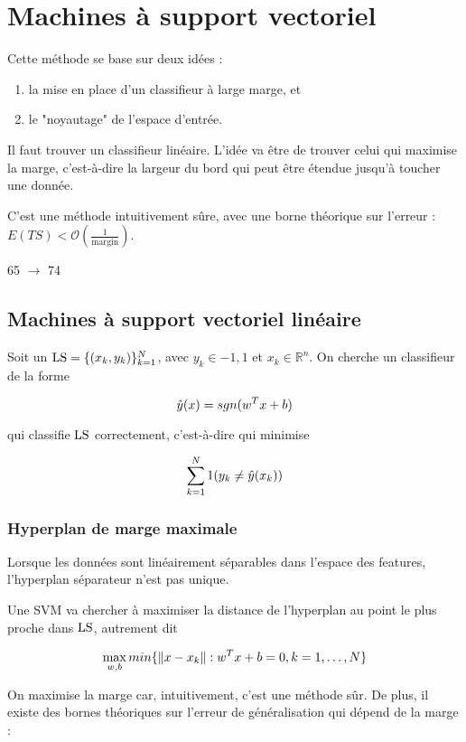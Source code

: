 \chapter{Machines à support vectoriel}

Cette méthode se base sur deux idées :

\begin{enumerate}
	\item la mise en place d'un classifieur à large marge, et
	\item le "noyautage" de l'espace d'entrée.
\end{enumerate}

Il faut trouver un classifieur linéaire. L'idée va être de trouver celui qui maximise la marge, c'est-à-dire la largeur du bord qui peut être étendue jusqu'à toucher une donnée.


C'est une méthode intuitivement sûre, avec une borne théorique sur l'erreur : $E(TS) < \mathcal{O}(\frac{1}{\text{margin}})$.

65 $\rightarrow$ 74

\section{Machines à support vectoriel linéaire}
	
	Soit un $\text{LS} = \lbrace (x_k, y_k) \rbrace^N_{k = 1}$, avec $y_k \in {-1, 1}$ et $x_k \in \mathbb{R}^n$. On cherche un classifieur de la forme
	
	$$\hat{y}(x) = sgn(w^T x + b)$$
	
	qui classifie $\text{LS}$ correctement, c'est-à-dire qui minimise
	
	$$\sum_{k = 1}^N1(y_k \neq \hat{y}(x_k))$$
	
	\subsection{Hyperplan de marge maximale}
	
	Lorsque les données sont linéairement séparables dans l'espace des features, l'hyperplan séparateur n'est pas unique.
	
	
	Une SVM va chercher à maximiser la distance de l'hyperplan au point le plus proche dans $\text{LS}$, autrement dit
	
	$$\max_{w, b} min \lbrace \Vert x - x_k \Vert : w^T x + b = 0, k = 1, \dots , N \rbrace$$
	
	On maximise la marge car, intuitivement, c'est une méthode sûr. De plus, il existe des bornes théoriques sur l'erreur de généralisation qui dépend de la marge :
	
